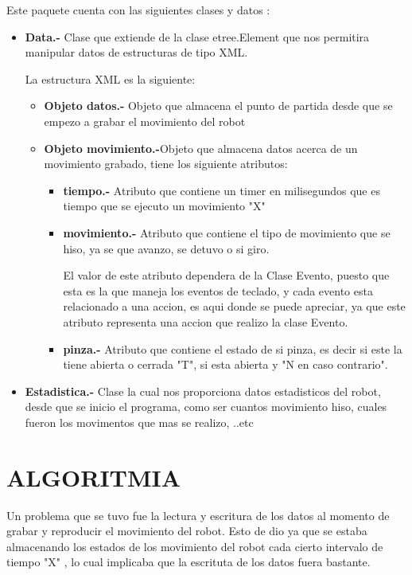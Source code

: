 \documentclass[letterpaper,12pt]{article}
\begin{document}
{Este paquete cuenta con las siguientes clases y datos :
\begin{itemize}
	\item \textbf{Data.- }Clase que extiende de la clase etree.Element que nos permitira manipular datos de estructuras de tipo XML.
	
	La estructura XML es la siguiente:
	\begin{itemize}
		
	 \item \textbf{Objeto datos.- }Objeto que almacena el punto de partida desde que se empezo a grabar el movimiento del robot
	 
	 \item \textbf{Objeto movimiento.-}Objeto que almacena datos acerca de un movimiento grabado, tiene los siguiente atributos:
	 	\begin{itemize}
			\item \textbf{tiempo.- }Atributo que contiene un timer en milisegundos que es tiempo que se ejecuto un movimiento "X"
			
			\item \textbf{movimiento.- }Atributo que contiene el tipo de movimiento que se hiso, ya se que avanzo, se detuvo o si giro.
			
			El valor de este atributo dependera de la Clase Evento, puesto que esta es la que maneja los eventos de teclado, y cada evento esta relacionado a una accion, es aqui donde se puede apreciar, ya que este atributo representa una accion que realizo la clase Evento.
			
			\item \textbf{pinza.- }Atributo que contiene el estado de si pinza, es decir si este la tiene abierta o cerrada "T", si esta abierta y "N en caso contrario".
			
		\end{itemize}
	\end{itemize}
	\item \textbf{Estadistica.- }Clase la cual nos proporciona datos estadisticos del robot, desde que se inicio el programa, como ser cuantos movimiento hiso, cuales fueron los movimentos que mas se realizo, ..etc


\end{itemize}

	

\section{ALGORITMIA}
Un problema que se tuvo fue la lectura y escritura de los datos al momento de grabar y reproducir el movimiento del robot. Esto de dio ya que se estaba almacenando los estados de los movimiento del robot cada cierto intervalo de tiempo "X" , lo cual implicaba que la escrituta de los datos fuera bastante.\\

}
\end{document}
